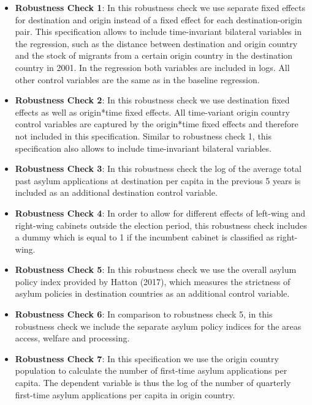 \documentclass[11pt,a4paper]{scrartcl}
\begin{document}
\begin{itemize}
	\itemsep0em
	\item \textbf{Robustness Check 1}: In this robustness check we use separate fixed effects for destination and origin instead of a fixed effect for each destination-origin pair. This specification allows to include time-invariant bilateral variables in the regression, such as the distance between destination and origin country and the stock of migrants from a certain origin country in the destination country in 2001. In the regression both variables are included in logs. All other control variables are the same as in the baseline regression.  
	
	\item \textbf{Robustness Check 2}: In this robustness check we use destination fixed effects as well as origin*time fixed effects. All time-variant origin country control variables are captured by the origin*time fixed effects and therefore not included in this specification. Similar to robustness check 1, this specification also allows to include time-invariant bilateral variables.  
	
	\item \textbf{Robustness Check 3}: In this robustness check the log of the average total past asylum applications at destination per capita in the previous 5 years is included as an additional destination control variable. 
	
	\item \textbf{Robustness Check 4}: In order to allow for different effects of left-wing and right-wing cabinets outside the election period, this robustness check includes a dummy which is equal to 1 if the incumbent cabinet is classified as right-wing.   
	
	\item \textbf{Robustness Check 5}: In this robustness check we use the overall asylum policy index provided by Hatton (2017), which measures the strictness of asylum policies in destination countries as an additional control variable.
	
	\item \textbf{Robustness Check 6}: In comparison to robustness check 5, in this robustness check we include the separate asylum policy indices for the areas access, welfare and processing. 
	
	\item \textbf{Robustness Check 7}: In this specification we use the origin country population to calculate the number of first-time asylum applications per capita. The dependent variable is thus the log of the number of quarterly first-time asylum applications per capita in origin country.  
	

\end{itemize}
\end{document}
